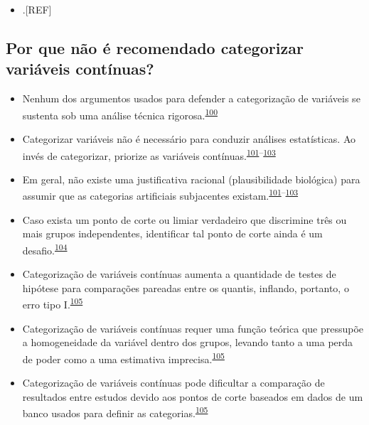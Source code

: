 \documentclass[
  a4paper,
]{book}
\providecommand{\tightlist}{%
  \setlength{\itemsep}{0pt}\setlength{\parskip}{0pt}}
\begin{document}
\begin{itemize}
\tightlist
\item
  .{[}REF{]}
\end{itemize}

\hypertarget{por-que-nuxe3o-uxe9-recomendado-categorizar-variuxe1veis-contuxednuas}{%
\subsection{Por que não é recomendado categorizar variáveis contínuas?}\label{por-que-nuxe3o-uxe9-recomendado-categorizar-variuxe1veis-contuxednuas}}

\begin{itemize}
\item
  Nenhum dos argumentos usados para defender a categorização de variáveis se sustenta sob uma análise técnica rigorosa.\textsuperscript{\protect\hyperlink{ref-MacCallum2002}{100}}
\item
  Categorizar variáveis não é necessário para conduzir análises estatísticas. Ao invés de categorizar, priorize as variáveis contínuas.\textsuperscript{\protect\hyperlink{ref-Altman2006}{101}--\protect\hyperlink{ref-Collins2016}{103}}
\item
  Em geral, não existe uma justificativa racional (plausibilidade biológica) para assumir que as categorias artificiais subjacentes existam.\textsuperscript{\protect\hyperlink{ref-Altman2006}{101}--\protect\hyperlink{ref-Collins2016}{103}}
\item
  Caso exista um ponto de corte ou limiar verdadeiro que discrimine três ou mais grupos independentes, identificar tal ponto de corte ainda é um desafio.\textsuperscript{\protect\hyperlink{ref-Prince2017}{104}}
\item
  Categorização de variáveis contínuas aumenta a quantidade de testes de hipótese para comparações pareadas entre os quantis, inflando, portanto, o erro tipo I.\textsuperscript{\protect\hyperlink{ref-Bennette2012}{105}}
\item
  Categorização de variáveis contínuas requer uma função teórica que pressupõe a homogeneidade da variável dentro dos grupos, levando tanto a uma perda de poder como a uma estimativa imprecisa.\textsuperscript{\protect\hyperlink{ref-Bennette2012}{105}}
\item
  Categorização de variáveis contínuas pode dificultar a comparação de resultados entre estudos devido aos pontos de corte baseados em dados de um banco usados para definir as categorias.\textsuperscript{\protect\hyperlink{ref-Bennette2012}{105}}
\end{itemize}
\end{document}
